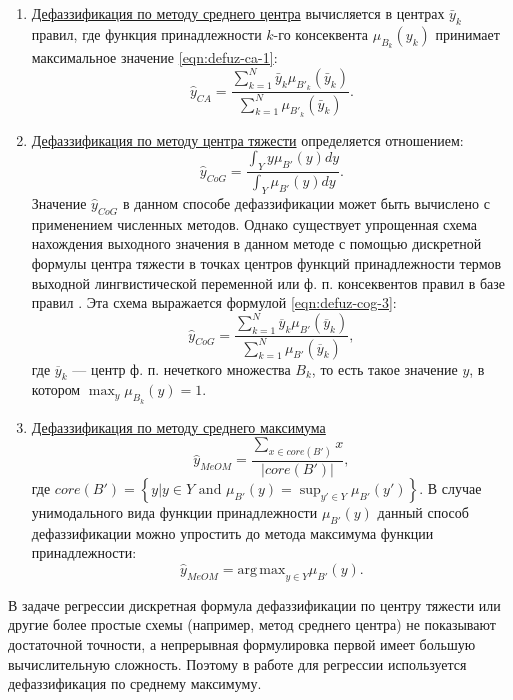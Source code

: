 \begin{enumerate}
	\item \ul{Дефаззификация по методу среднего центра} вычисляется в центрах $\bar{y}_k$ правил, где функция принадлежности $k$-го консеквента $\mu_{B_k}(y_k)$ принимает максимальное значение \eqref{eqn:defuz-ca-1}:
	\begin{equation}
		\label{eqn:defuz-ca-1}
		\hat{y}_{CA} = \frac{\sum_{k=1}^{N} \bar{y}_k \mu_{B'_k}(\bar{y}_k)}{\sum_{k=1}^{N} \mu_{B'_k}(\bar{y}_k)}.
	\end{equation}
	\item \ul{Дефаззификация по методу центра тяжести} определяется отношением:
	\begin{equation}
		\label{eqn:defuz-cog-1}
		\hat{y}_{CoG} = \frac{\int_Y y \mu_{B'}(y) dy}{\int_Y \mu_{B'}(y) dy}.
	\end{equation}
	Значение $\hat{y}_{CoG}$ в данном способе дефаззификации может быть вычислено с применением численных методов. Однако существует упрощенная схема нахождения выходного значения в данном методе с помощью дискретной формулы центра тяжести в точках центров функций принадлежности термов выходной лингвистической переменной или ф. п. консеквентов правил в базе правил \cite{rutkovskiy2010}. Эта схема выражается формулой \eqref{eqn:defuz-cog-3}:
	\begin{equation}
		\label{eqn:defuz-cog-3}
		\hat{y}_{CoG} = \frac{\sum_{k=1}^{N} \overline{y}_k \mu_{B'}(\overline{y}_k)}{\sum_{k=1}^{N} \mu_{B'}(\overline{y}_k)},
	\end{equation}
	где $\overline{y}_k$ --- центр ф. п. нечеткого множества $B_k$, то есть такое значение $y$, в котором $\max_y \mu_{B_k}(y) = 1$.
	\item \ul{Дефаззификация по методу среднего максимума}
	\begin{equation}
		\hat{y}_{MeOM} = \frac{\sum_{x \in core(B')} x}{|core(B')|},
	\end{equation}
	где $core(B') = \left\{y | y \in Y \textrm{ and } \mu_{B'}(y) = \sup_{y' \in Y} \mu_{B'}(y')\right\}$. 
	В случае унимодального вида функции принадлежности $\mu_{B'}(y)$ данный способ дефаззификации можно упростить до метода максимума функции принадлежности:
	\begin{equation}
	\hat{y}_{MeOM} = \mathrm{arg\,max}_{y \in Y} \mu_{B'}(y).
	\end{equation}
\end{enumerate}

В задаче регрессии дискретная формула дефаззификации по центру тяжести или другие более простые схемы (например, метод среднего центра) не показывают достаточной точности, а непрерывная формулировка первой имеет большую вычислительную сложность. Поэтому в работе для регрессии используется дефаззификация по среднему максимуму.

